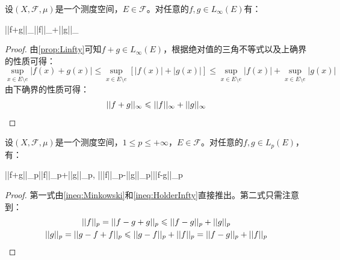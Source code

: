 \begin{theorem}
	设$(X,\mathscr{F},\mu)$是一个测度空间，$E\in\mathscr{F}$。对任意的$f,g\in L_{\infty}(E)$有：
	\begin{inequality*}\label{ineq:MinkowskiInfty}
		||f+g||_{\infty}\leqslant||f||_{\infty}+||g||_{\infty}
	\end{inequality*}
\end{theorem}
\begin{proof}
	由\cref{prop:Linfty}可知$f+g\in L_{\infty}(E)$，根据绝对值的三角不等式以及上确界的性质可得：
	\begin{equation*}
		\sup_{x\in E\setminus e}|f(x)+g(x)|\leqslant\sup_{x\in E\setminus e}[|f(x)|+|g(x)|]\leqslant\sup_{x\in E\setminus e}|f(x)|+\sup_{x\in E\setminus e}|g(x)|
	\end{equation*}
	由下确界的性质可得：
	\begin{equation*}
		||f+g||_{\infty}\leqslant||f||_{\infty}+||g||_{\infty}\qedhere
	\end{equation*}
\end{proof}
\begin{theorem}
	设$(X,\mathscr{F},\mu)$是一个测度空间，$1\leqslant p\leqslant+\infty$，$E\in\mathscr{F}$。对任意的$f,g\in L_p(E)$，有：
	\begin{inequality*}\label{ineq:minkowski-ineq-norm-all}
		||f+g||_p\leqslant||f||_p+||g||_p,\quad
		\Big|||f||_p-||g||_p\Big|\leqslant||f-g||_p
	\end{inequality*}
\end{theorem}
\begin{proof}
	第一式由\cref{ineq:Minkowski}和\cref{ineq:HolderInfty}直接推出。第二式只需注意到：
	\begin{gather*}
		||f||_p=||f-g+g||_p\leqslant||f-g||_p+||g||_p \\
		||g||_p=||g-f+f||_p\leqslant||g-f||_p+||f||_p=||f-g||_p+||f||_p\qedhere
	\end{gather*}
\end{proof}

